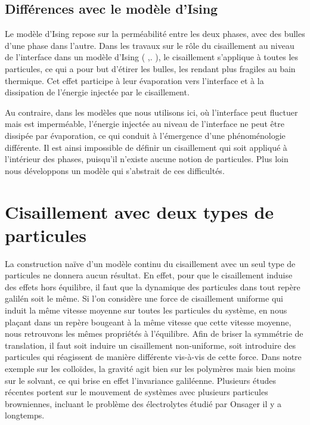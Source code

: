 	\subsection{Différences avec le modèle d'Ising}

	Le modèle d'Ising repose sur la perméabilité entre les deux phases, avec des bulles d'une phase dans l'autre. Dans les travaux sur le rôle du cisaillement au niveau de l'interface dans un modèle d'Ising ( \cite{smith_driven_2010},\cite{smith_interfaces_2008}. ), le cisaillement s'applique à toutes les particules, ce qui a pour but d'étirer les bulles, les rendant plus fragiles au bain thermique. Cet effet participe à leur évaporation vers l'interface et à la dissipation de l'énergie injectée par le cisaillement.
	
	Au contraire, dans les modèles que nous utilisons ici, où l'interface peut fluctuer mais est imperméable, l'énergie injectée au niveau de l'interface ne peut être dissipée par évaporation, ce qui conduit à l'émergence d'une phénoménologie différente. Il est ainsi impossible de définir un cisaillement qui soit appliqué à l'intérieur des phases, puisqu'il n'existe aucune notion de particules. Plus loin nous développons un modèle qui s'abstrait de ces difficultés. 


\section{Cisaillement avec deux types de particules}

La construction naïve d'un modèle continu du cisaillement avec un seul type de particules ne donnera aucun résultat. En effet, pour que le cisaillement induise des effets hors équilibre, il faut que la dynamique des particules dans tout repère galilén soit le même. Si l'on considère une force de cisaillement uniforme qui induit la même vitesse moyenne sur toutes les particules du système, en nous plaçant dans un repère bougeant à la même vitesse que cette vitesse moyenne, nous retrouvons les mêmes propriétés à l'équilibre.
Afin de briser la symmétrie de translation, il faut soit induire un cisaillement non-uniforme, soit introduire des particules qui réagissent de manière différente vis-à-vis de cette force. Dans notre exemple sur les colloïdes, la gravité agit bien sur les polymères mais bien moins sur le solvant, ce qui brise en effet l'invariance galiléenne. 
Plusieurs études récentes portent sur le mouvement de systèmes avec plusieurs particules browniennes\cite{netz2003,dzub2002,chak2003,chak2004,lowe2009,glan2012, klym2016}, incluant le problème des électrolytes étudié par Onsager \cite{onsager} il y a longtemps.

